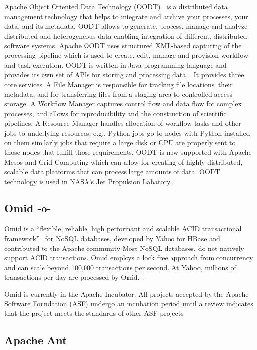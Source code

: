 Apache Object Oriented Data Technology (OODT)~\cite{www-oodt} is a
distributed data management technology that helps to integrate and
archive your processes, your data, and its metadata. OODT allows to
generate, process, manage and analyze distributed and heterogeneous
data enabling integration of different, distributed software
systems. Apache OODT uses structured XML-based capturing of the
processing pipeline which is used to create, edit, manage and
provision workflow and task execution. OODT is written in Java
programming language and provides its own set of APIs for storing and
processing data.~\cite{www-oodt-documentation} It provides three core
services. A File Manager is responsible for tracking file locations,
their metadata, and for transferring files from a staging area to
controlled access storage. A Workflow Manager captures control flow
and data flow for complex processes, and allows for reproducibility
and the construction of scientific pipelines. A Resource Manager
handles allocation of workflow tasks and other jobs to underlying
resources, e.g., Python jobs go to nodes with Python installed on them
similarly jobs that require a large disk or CPU are properly sent to
those nodes that fulfill those requirements. OODT is now supported
with Apache Mesos and Grid Computing which can allow for creating of
highly distributed, scalable data platforms that can process large
amounts of data. OODT technology is used in NASA's Jet Propulsion
Labatory.

\subsection{Omid -o-}

Omid is a ``flexible, reliable, high performant and scalable ACID
transactional framework''~\cite{www-apacheomid} for NoSQL databases,
developed by Yahoo for HBase and contributed to the Apache community
Most NoSQL databases, do not natively support ACID transactions. Omid
employs a lock free approach from concurrency and can scale beyond
100,000 transactions per second. At Yahoo, millions of transactions
per day are processed by Omid.~\cite{www-yahooomid}.

Omid is currently in the Apache Incubator.  All projects accepted by
the Apache Software Foundation (ASF) undergo an incubation period
until a review indicates that the project meets the standards of other
ASF projects~\cite{www-apacheincubator}


\subsection{Apache Ant}

